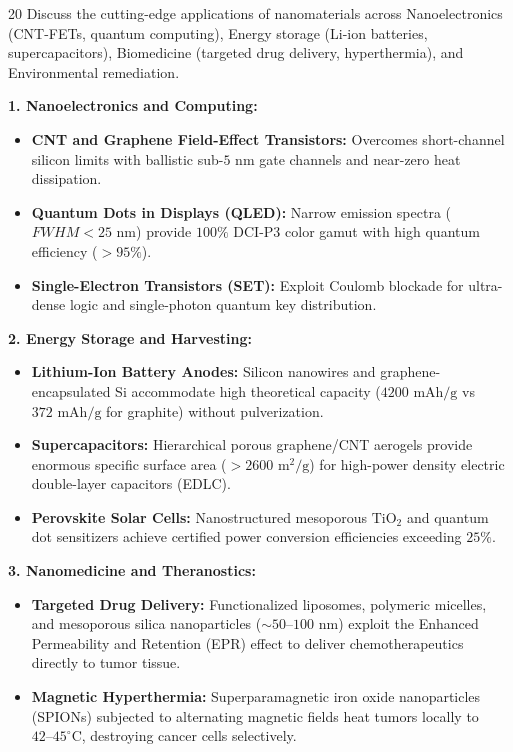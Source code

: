 \begin{theoryq}{20}
Discuss the cutting-edge applications of nanomaterials across Nanoelectronics (CNT-FETs, quantum computing), Energy storage (Li-ion batteries, supercapacitors), Biomedicine (targeted drug delivery, hyperthermia), and Environmental remediation.
\end{theoryq}
\begin{theorysol}
\textbf{1. Nanoelectronics and Computing:}
\begin{itemize}
\item \textbf{CNT and Graphene Field-Effect Transistors:} Overcomes short-channel silicon limits with ballistic sub-$5\text{ nm}$ gate channels and near-zero heat dissipation.
\item \textbf{Quantum Dots in Displays (QLED):} Narrow emission spectra ($FWHM < 25\text{ nm}$) provide $100\%$ DCI-P3 color gamut with high quantum efficiency ($>95\%$).
\item \textbf{Single-Electron Transistors (SET):} Exploit Coulomb blockade for ultra-dense logic and single-photon quantum key distribution.
\end{itemize}

\textbf{2. Energy Storage and Harvesting:}
\begin{itemize}
\item \textbf{Lithium-Ion Battery Anodes:} Silicon nanowires and graphene-encapsulated Si accommodate high theoretical capacity ($4200\text{ mAh/g}$ vs $372\text{ mAh/g}$ for graphite) without pulverization.
\item \textbf{Supercapacitors:} Hierarchical porous graphene/CNT aerogels provide enormous specific surface area ($>2600\text{ m}^2/\text{g}$) for high-power density electric double-layer capacitors (EDLC).
\item \textbf{Perovskite Solar Cells:} Nanostructured mesoporous $\text{TiO}_2$ and quantum dot sensitizers achieve certified power conversion efficiencies exceeding $25\%$.
\end{itemize}

\textbf{3. Nanomedicine and Theranostics:}
\begin{itemize}
\item \textbf{Targeted Drug Delivery:} Functionalized liposomes, polymeric micelles, and mesoporous silica nanoparticles ($\sim 50\text{--}100\text{ nm}$) exploit the Enhanced Permeability and Retention (EPR) effect to deliver chemotherapeutics directly to tumor tissue.
\item \textbf{Magnetic Hyperthermia:} Superparamagnetic iron oxide nanoparticles (SPIONs) subjected to alternating magnetic fields heat tumors locally to $42\text{--}45^\circ\text{C}$, destroying cancer cells selectively.
\end{itemize}


\end{theorysol}
